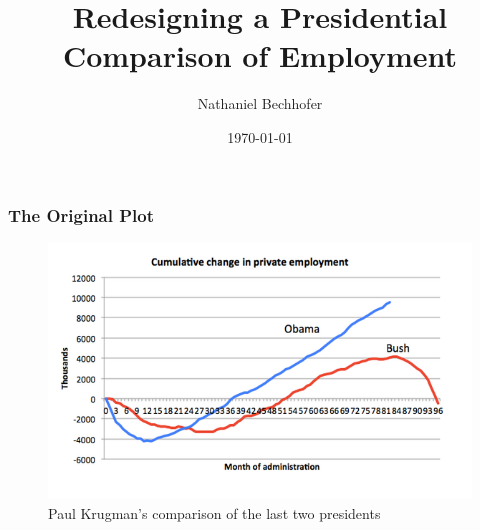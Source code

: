 \documentclass{beamer}
\title{Redesigning a Presidential Comparison of Employment}
\author{Nathaniel Bechhofer}
\date{\today}
\begin{document}
\frame{\titlepage}




\frame
{
  \frametitle{The Original Plot}

\begin{figure}[htbp]
\begin{center}
\includegraphics[scale=0.3]{Original.png}
\caption{Paul Krugman's comparison of the last two presidents}
\end{center}
\end{figure}


}
\end{document}
